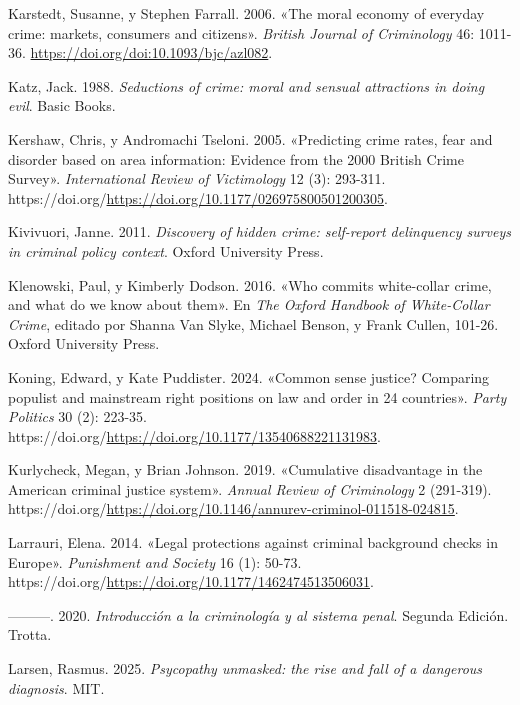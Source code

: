 \documentclass[
  spanish,
  letterpaper,
  DIV=11,
  numbers=noendperiod]{scrreprt}
\newlength{\cslhangindent}
\newenvironment{CSLReferences}[2] %
 {\begin{list}{}{%
  \setlength{\itemindent}{0pt}
  \setlength{\leftmargin}{0pt}
  \setlength{\parsep}{0pt}
  \ifodd #1
   \setlength{\leftmargin}{\cslhangindent}
   \setlength{\itemindent}{-1\cslhangindent}
  \fi
  \setlength{\itemsep}{#2\baselineskip}}}
 {\end{list}}
\begin{document}
\begin{CSLReferences}{1}{0}
Karstedt, Susanne, y Stephen Farrall. 2006. {«The moral economy of
everyday crime: markets, consumers and citizens»}. \emph{British Journal
of Criminology} 46: 1011-36.
\url{https://doi.org/doi:10.1093/bjc/azl082}.

Katz, Jack. 1988. \emph{Seductions of crime: moral and sensual
attractions in doing evil}. Basic Books.

Kershaw, Chris, y Andromachi Tseloni. 2005. {«Predicting crime rates,
fear and disorder based on area information: Evidence from the 2000
British Crime Survey»}. \emph{International Review of Victimology} 12
(3): 293-311.
https://doi.org/\url{https://doi.org/10.1177/026975800501200305}.

Kivivuori, Janne. 2011. \emph{Discovery of hidden crime: self-report
delinquency surveys in criminal policy context}. Oxford University
Press.

Klenowski, Paul, y Kimberly Dodson. 2016. {«Who commits white-collar
crime, and what do we know about them»}. En \emph{The Oxford Handbook of
White-Collar Crime}, editado por Shanna Van Slyke, Michael Benson, y
Frank Cullen, 101-26. Oxford University Press.

Koning, Edward, y Kate Puddister. 2024. {«Common sense justice?
Comparing populist and mainstream right positions on law and order in 24
countries»}. \emph{Party Politics} 30 (2): 223-35.
https://doi.org/\url{https://doi.org/10.1177/13540688221131983}.

Kurlycheck, Megan, y Brian Johnson. 2019. {«Cumulative disadvantage in
the American criminal justice system»}. \emph{Annual Review of
Criminology} 2 (291-319).
https://doi.org/\url{https://doi.org/10.1146/annurev-criminol-011518-024815}.

Larrauri, Elena. 2014. {«Legal protections against criminal background
checks in Europe»}. \emph{Punishment and Society} 16 (1): 50-73.
https://doi.org/\url{https://doi.org/10.1177/1462474513506031}.

---------. 2020. \emph{Introducción a la criminología y al sistema
penal}. Segunda Edición. Trotta.

Larsen, Rasmus. 2025. \emph{Psycopathy unmasked: the rise and fall of a
dangerous diagnosis}. MIT.


\end{CSLReferences}
\end{document}
